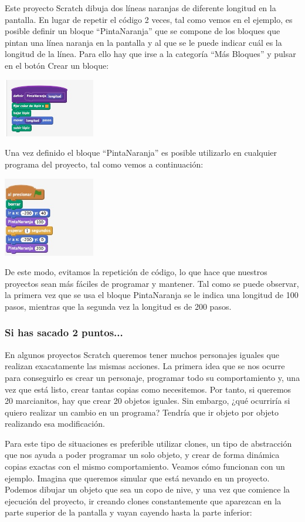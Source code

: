 \documentclass[a4paper,10pt]{article}
\begin{document}
Este proyecto Scratch dibuja dos líneas naranjas de diferente longitud en la pantalla. En lugar de repetir el código 2 veces, tal como vemos en el ejemplo, es posible definir un bloque “PintaNaranja” que se compone de los bloques que pintan una línea naranja en la pantalla y al que se le puede indicar cuál es la longitud de la línea. Para ello hay que irse a la categoría “Más Bloques” y pulsar en el botón Crear un bloque:


\includegraphics[width=4cm]{img/abs4.jpg}


Una vez definido el bloque “PintaNaranja” es posible utilizarlo en cualquier programa del proyecto, tal como vemos a continuación:


\includegraphics[width=4cm]{img/abs5.jpg}


De este modo, evitamos la repetición de código, lo que hace que nuestros proyectos sean más fáciles de programar y mantener. Tal como se puede observar, la primera vez que se usa el bloque PintaNaranja se le indica una longitud de 100 pasos, mientras que la segunda vez la longitud es de 200 pasos.
\subsubsection{Si has sacado 2 puntos...}

En algunos proyectos Scratch queremos tener muchos personajes iguales que realizan exacatamente las mismas acciones. La primera idea que se nos ocurre para conseguirlo es crear un personaje, programar todo su comportamiento y, una vez que está listo, crear tantas copias como necesitemos. Por tanto, si queremos 20 marcianitos, hay que crear 20 objetos iguales. Sin embargo, ¿qué ocurriría si quiero realizar un cambio en un programa? Tendría que ir objeto por objeto realizando esa modificación.

Para este tipo de situaciones es preferible utilizar clones, un tipo de abstracción que nos ayuda a poder programar un solo objeto, y crear de forma dinámica copias exactas con el mismo comportamiento. 
Veamos cómo funcionan con un ejemplo. Imagina que queremos simular que está nevando en un proyecto. Podemos dibujar un objeto que sea un copo de nive, y una vez que comience la ejecución del proyecto, ir creando clones constantemente que aparezcan en la parte superior de la pantalla y vayan cayendo hasta la parte inferior:
\end{document}
